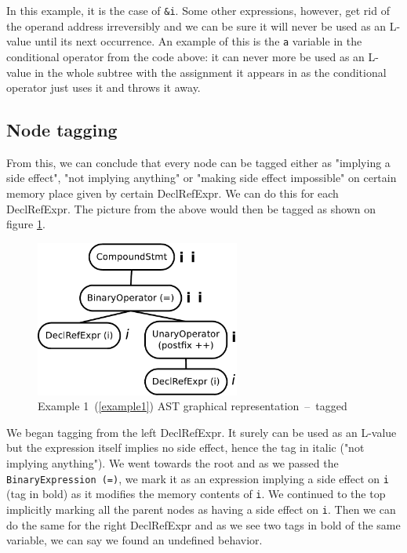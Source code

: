 In this example, it is the case of \verb|&i|. Some other expressions, however, get rid of the operand address irreversibly and we can be sure it will never be used as an L-value until its next occurrence. An example of this is the \verb|a| variable in the conditional operator from the code above: it can never more be used as an L-value in the whole subtree with the assignment it appears in as the conditional operator just uses it and throws it away.

\subsection{Node tagging}
From this, we can conclude that every node can be tagged either as "implying a side effect", "not implying anything" or "making side effect impossible" on certain memory place given by certain DeclRefExpr. We can do this for each DeclRefExpr. The picture from the above would then be tagged as shown on figure \ref{ASTtagged}.
\begin{figure}
    \caption{Example 1~(\ref{example1}) AST graphical representation~--~tagged}
    \label{ASTtagged}
    \centering
        \includegraphics[width=0.6\textwidth]{fig/example1G-tagged.pdf}
\end{figure}

We began tagging from the left DeclRefExpr. It surely can be used as an L-value but the expression itself implies no side effect, hence the tag in italic ("not implying anything"). We went towards the root and as we passed the \verb|BinaryExpression (=)|, we mark it as an expression implying a side effect on \verb|i| (tag in bold) as it modifies the memory contents of \verb|i|. We continued to the top implicitly marking all the parent nodes as having a side effect on \verb|i|. Then we can do the same for the right DeclRefExpr and as we see two tags in bold of the same variable, we can say we found an undefined behavior.

